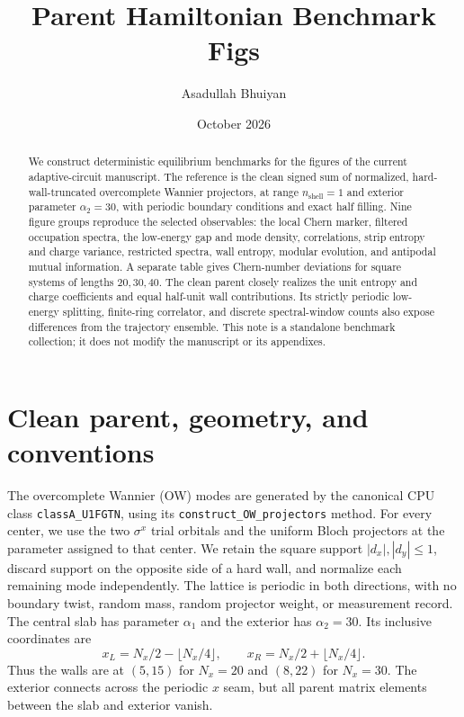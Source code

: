 \documentclass[aps,prb,onecolumn,nofootinbib,superscriptaddress]{revtex4-2}
\begin{document}
\title{Parent Hamiltonian Benchmark Figs}
\author{Asadullah Bhuiyan}
\noaffiliation
\date{October 2026}
\begin{abstract}
We construct deterministic equilibrium benchmarks for the figures of the current
adaptive-circuit manuscript. The reference is the clean signed sum of normalized,
hard-wall-truncated overcomplete Wannier projectors, at range
$n_{\mathrm{shell}}=1$ and exterior parameter $\alpha_2=30$, with periodic boundary
conditions and exact half filling. Nine figure groups reproduce the selected
observables: the local Chern marker, filtered occupation spectra, the low-energy
gap and mode density, correlations, strip entropy and charge variance, restricted
spectra, wall entropy, modular evolution, and antipodal mutual information. A
separate table gives Chern-number deviations for square systems of lengths
$20,30,40$. The clean parent closely realizes the unit entropy and charge
coefficients and equal half-unit wall contributions. Its strictly periodic
low-energy splitting, finite-ring correlator, and discrete spectral-window counts
also expose differences from the trajectory ensemble. This note is a standalone
benchmark collection; it does not modify the manuscript or its appendixes.
\end{abstract}
\maketitle
\setcounter{tocdepth}{2}
\tableofcontents

\clearpage
\section{Clean parent, geometry, and conventions}
\label{sec:construction}
The overcomplete Wannier (OW) modes are generated by the canonical CPU class
\texttt{classA\_U1FGTN}, using its \texttt{construct\_OW\_projectors} method.
For every center, we use the two
$\sigma^x$ trial orbitals and the uniform Bloch projectors at the parameter assigned
to that center. We retain the square support $|d_x|,|d_y|\leq1$, discard support on
the opposite side of a hard wall, and normalize each remaining mode independently.
The lattice is periodic in both directions, with no boundary twist, random mass,
random projector weight, or measurement record. The central slab has parameter
$\alpha_1$ and the exterior has $\alpha_2=30$. Its inclusive coordinates are
\begin{equation}
 x_L=N_x/2-\lfloor N_x/4\rfloor,\qquad
 x_R=N_x/2+\lfloor N_x/4\rfloor.
\end{equation}
Thus the walls are at $(5,15)$ for $N_x=20$ and $(8,22)$ for $N_x=30$.
The exterior connects across the periodic $x$ seam, but all parent matrix elements
between the slab and exterior vanish.
\end{document}
